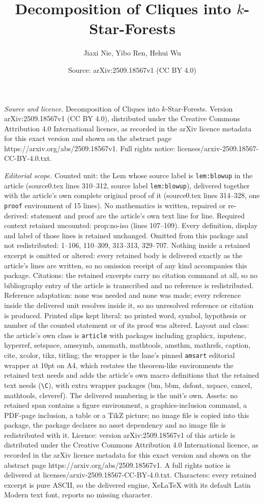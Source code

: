 \documentclass[10pt,a4paper]{amsart}
\title[Decomposition of Cliques into $k$-Star-Forests]{Decomposition of Cliques into $k$-Star-Forests}
\author{Jiaxi Nie, Yibo Ren, Hehui Wu}
\date{Source: arXiv:2509.18567v1 (CC BY 4.0)}
\begin{document}
\maketitle

\noindent\emph{Source and licence.} Decomposition of Cliques into $k$-Star-Forests. Version arXiv:2509.18567v1 (CC BY 4.0), distributed under the Creative Commons Attribution 4.0 International licence, as recorded in the arXiv licence metadata for this exact version and shown on the abstract page https://arxiv.org/abs/2509.18567v1. Full rights notice: licenses/arxiv-2509.18567-CC-BY-4.0.txt.\par\smallskip

\noindent\textit{Editorial scope.} Counted unit: the Lem whose source label is \texttt{lem:blowup} in the article (source0.tex lines 310--312, source label \texttt{lem:blowup}), delivered together with the article's own complete original proof of it (source0.tex lines 314--328, one \texttt{proof} environment of 15 lines). No mathematics is written, repaired or re-derived: statement and proof are the article's own text line for line. Required context retained uncounted: prop:no-iso (lines 107--109). Every definition, display and label of those lines is retained unchanged. Omitted from this package and not redistributed: 1--106, 110--309, 313--313, 329--707. Nothing inside a retained excerpt is omitted or altered: every retained body is delivered exactly as the article's lines are written, so no omission receipt of any kind accompanies this package. Citations: the retained excerpts carry no citation command at all, so no bibliography entry of the article is transcribed and no reference is redistributed. Reference adaptation: none was needed and none was made; every reference inside the delivered unit resolves inside it, so no unresolved reference or citation is produced. Printed slips kept literal: no printed word, symbol, hypothesis or number of the counted statement or of its proof was altered. Layout and class: the article's own class is \texttt{article} with packages including graphicx, inputenc, hyperref, setspace, amssymb, amsmath, mathtools, amsthm, mathrsfs, caption, cite, xcolor, tikz, titling; the wrapper is the lane's pinned \texttt{amsart} editorial wrapper at 10pt on A4, which restates the theorem-like environments the retained text needs and adds the article's own macro definitions that the retained text needs (\texttt{\textbackslash C}), with extra wrapper packages (bm, bbm, dsfont, xspace, cancel, mathtools, cleveref). The delivered numbering is the unit's own. Assets: no retained span contains a figure environment, a graphics-inclusion command, a PDF-page inclusion, a table or a TikZ picture; no image file is copied into this package, the package declares no asset dependency and no image file is redistributed with it. Licence: version arXiv:2509.18567v1 of this article is distributed under the Creative Commons Attribution 4.0 International licence, as recorded in the arXiv licence metadata for this exact version and shown on the abstract page https://arxiv.org/abs/2509.18567v1. A full rights notice is delivered at licenses/arxiv-2509.18567-CC-BY-4.0.txt. Characters: every retained excerpt is pure ASCII, so the delivered engine, XeLaTeX with its default Latin Modern text font, reports no missing character.
\end{document}
